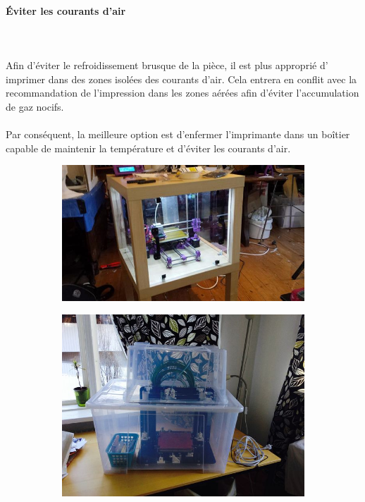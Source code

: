 \documentclass[11pt,a4paper]{article}
\begin{document}
			\paragraph{Éviter les courants d’air}\mbox{}\\\\
Afin d'éviter le refroidissement brusque de la pièce, il est plus approprié d’ imprimer dans des zones isolées des courants d’air. Cela entrera en conflit avec la recommandation de l’impression dans les zones aérées afin d’éviter l’accumulation de gaz nocifs.
\\\\
Par conséquent, la meilleure option est d'enfermer l’imprimante dans un boîtier capable de maintenir la température et d’éviter les courants d’air.
\begin{figure}[H]
    \centering
    \begin{subfigure}[b]{0.3\textwidth}
        \includegraphics[width=\textwidth,cfbox=azul_marcos 4pt 0pt]{FOTOS/CERRAMIENTO1}
    \end{subfigure}
    \quad %
    \begin{subfigure}[b]{0.3\textwidth}
        \includegraphics[width=\textwidth,cfbox=azul_marcos 4pt 0pt]{FOTOS/CERRAMIENTO2}

\end{subfigure}
\end{figure}
\end{document}
